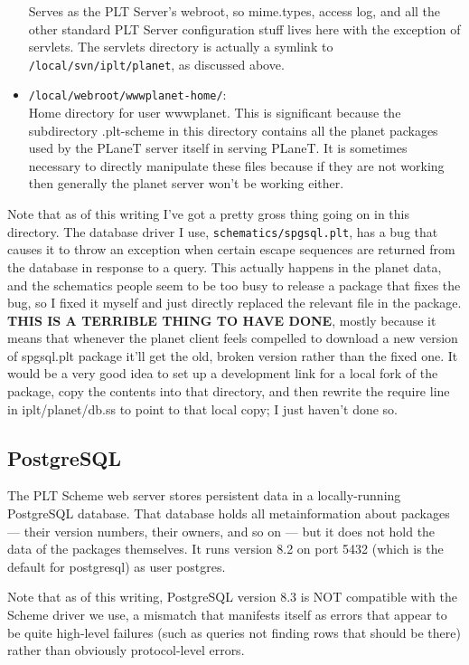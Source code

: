 \documentclass{article}
\begin{document}
\begin{itemize}
Serves as the PLT Server's webroot, so mime.types, access log, and all
  the other standard PLT Server configuration stuff lives here with
  the exception of servlets. The servlets directory is actually a
  symlink to \texttt{/local/svn/iplt/planet}, as discussed above.
\item \texttt{/local/webroot/wwwplanet-home/}: \\
Home directory for user wwwplanet. This is significant because the
  subdirectory .plt-scheme in this directory contains all the planet
  packages used by the PLaneT server itself in serving PLaneT. It is
  sometimes necessary to directly manipulate these files because if
  they are not working then generally the planet server won't be
  working either.
\end{itemize}

Note that as of this writing I've got a pretty gross thing going on in
this directory. The database driver I use, \texttt{schematics/spgsql.plt}, has
a bug that causes it to throw an exception when certain escape
sequences are returned from the database in response to a query. This
actually happens in the planet data, and the schematics people seem to
be too busy to release a package that fixes the bug, so I fixed it
myself and just directly replaced the relevant file in the
package. \textbf{THIS IS A TERRIBLE THING TO HAVE DONE}, mostly because it
means that whenever the planet client feels compelled to download a
new version of spgsql.plt package it'll get the old, broken version
rather than the fixed one. It would be a very good idea to set up a
development link for a local fork of the package, copy the contents
into that directory, and then rewrite the require line in
iplt/planet/db.ss to point to that local copy; I just haven't done
so.

\subsection{PostgreSQL}

The PLT Scheme web server stores persistent data in a locally-running
PostgreSQL database. That database holds all metainformation about
packages --- their version numbers, their owners, and so on --- but it
does not hold the data of the packages themselves. It runs version 8.2
on port 5432 (which is the default for postgresql) as user
postgres. 

Note that as of this writing, PostgreSQL version 8.3 is NOT compatible
with the Scheme driver we use, a mismatch that manifests itself as
errors that appear to be quite high-level failures (such as queries
not finding rows that should be there) rather than obviously
protocol-level errors.
\end{document}
